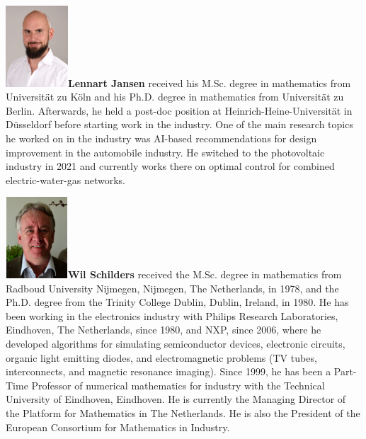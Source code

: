 \documentclass[AMA,STIX1COL]{WileyNJD-v2}
\begin{document}
\vspace{0.5cm}
\begin{biography}{\includegraphics[width=66pt,height=86pt]{jansen}}{\textbf{Lennart Jansen} received his M.Sc. degree in mathematics from Universität zu Köln and his Ph.D. degree in mathematics from Universität zu Berlin. Afterwards, he held a post-doc position at Heinrich-Heine-Universität in Düsseldorf before starting work in the industry. One of the main research topics he worked on in the industry was AI-based recommendations for design improvement in the automobile industry. He switched to the photovoltaic industry in 2021 and currently works there on optimal control for combined electric-water-gas networks.}
\end{biography}
\vspace{0.5cm}
\begin{biography}{\includegraphics[width=66pt,height=86pt]{schilders}}{\textbf{Wil Schilders} received the M.Sc. degree in mathematics from Radboud University Nijmegen, Nijmegen, The Netherlands, in 1978, and the Ph.D. degree from the Trinity College Dublin, Dublin, Ireland, in 1980. He has been working in the electronics industry with Philips Research Laboratories, Eindhoven, The Netherlands, since 1980, and NXP, since 2006, where he developed algorithms for simulating semiconductor devices, electronic circuits, organic light emitting diodes, and electromagnetic problems (TV tubes, interconnects, and magnetic resonance imaging). Since 1999, he has been a Part-Time Professor of numerical mathematics for industry with the Technical University of Eindhoven, Eindhoven. He is currently the Managing Director of the Platform for Mathematics in The Netherlands. He is also the President of the European Consortium for Mathematics in Industry.}
\end{biography}
\vspace{0.5cm}
\end{document}
